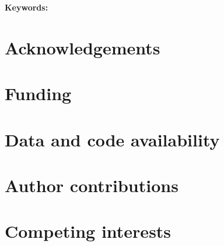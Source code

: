 \documentclass[11pt,a4paper]{article}
\title{\papertitle}
\date{Draft }
\date{}
\begin{document}
\maketitle

\begin{abstract}
\paperabstract
\end{abstract}

\noindent\textbf{Keywords:} \paperkeywords



\section*{Acknowledgements}
\paperacknowledgements

\section*{Funding}
\paperfunding

\section*{Data and code availability}
\paperavailability

\section*{Author contributions}
\papercontributions

\section*{Competing interests}
\papercompeting


\end{document}
